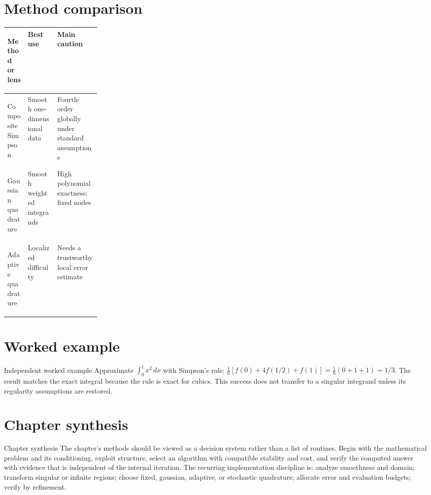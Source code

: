 \documentclass[10pt,letterpaper]{article}
\begin{document}
\section*{Method comparison}
\begin{center}
\small
\begin{tabularx}{\linewidth}{>{\bfseries\raggedright\arraybackslash}p{0.22\linewidth}XX}
\toprule
Method or lens & Best use & Main caution \\
\midrule
Composite Simpson & Smooth one-dimensional data & Fourth-order globally under standard assumptions \\
Gaussian quadrature & Smooth weighted integrands & High polynomial exactness; fixed nodes \\
Adaptive quadrature & Localized difficulty & Needs a trustworthy local error estimate \\
\bottomrule
\end{tabularx}
\end{center}

\section*{Worked example}
\begin{exambox}{Independent worked example}
Approximate $\int_0^1 x^2\,dx$ with Simpson's rule: $\tfrac16[f(0)+4f(1/2)+f(1)]=\tfrac16(0+1+1)=1/3$.  The result matches the exact integral because the rule is exact for cubics.  This success does not transfer to a singular integrand unless its regularity assumptions are restored.
\end{exambox}

\section*{Chapter synthesis}
\begin{summarybox}{Chapter synthesis}
The chapter's methods should be viewed as a decision system rather than a list of routines.  Begin with the mathematical problem and its conditioning, exploit structure, select an algorithm with compatible stability and cost, and verify the computed answer with evidence that is independent of the internal iteration.  The recurring implementation discipline is: analyze smoothness and domain; transform singular or infinite regions; choose fixed, gaussian, adaptive, or stochastic quadrature; allocate error and evaluation budgets; verify by refinement.
\end{summarybox}
\end{document}
